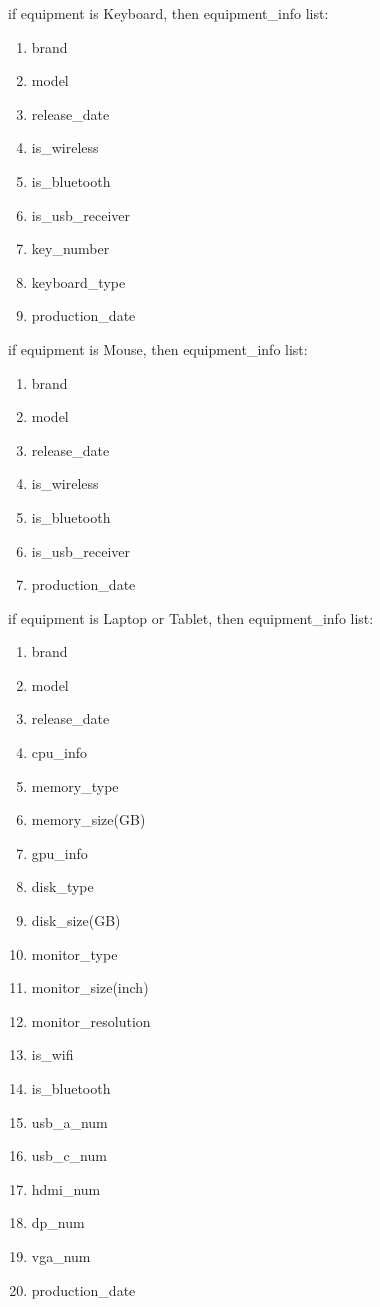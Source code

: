 \documentclass[a4paper,11pt]{article}
\begin{document}
if equipment is Keyboard, then equipment\_info list:
\begin{enumerate}
	\item brand
	\item model
	\item release\_date
	\item is\_wireless
	\item is\_bluetooth
	\item is\_usb\_receiver
	\item key\_number
	\item keyboard\_type
	\item production\_date
\end{enumerate}

if equipment is Mouse, then equipment\_info list:
\begin{enumerate}
	\item brand
	\item model
	\item release\_date
	\item is\_wireless
	\item is\_bluetooth
	\item is\_usb\_receiver
	\item production\_date
\end{enumerate}

if equipment is Laptop or Tablet, then equipment\_info  list:
\begin{enumerate}
	\item brand
	\item model
	\item release\_date
	\item cpu\_info
	\item memory­\_type
	\item memory\_size(GB)
	\item gpu­\_info
	\item disk\_type
	\item disk\_size(GB)
	\item monitor­\_type
	\item monitor\_size(inch)
	\item monitor\_resolution
	\item is\_wifi
	\item is\_bluetooth
	\item usb\_a\_num
	\item usb\_c\_num
	\item hdmi\_num
	\item dp\_num
	\item vga\_num
	\item production\_date
\end{enumerate}
\end{document}
